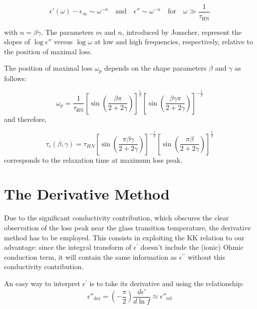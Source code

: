 \[
\epsilon'(\omega) - \epsilon_\infty \sim \omega^{-n} \quad \text{and} \quad \epsilon'' \sim \omega^{-n} \quad \text{for} \quad \omega \gg \frac{1}{\tau_{\text{HN}}}
\]

with \( n = \beta \gamma \). The parameters \( m \) and \( n \), introduced by Jonscher, represent the slopes of \( \log \epsilon'' \) versus \( \log \omega \) at low and high frequencies, respectively, relative to the position of maximal loss.

The position of maximal loss \( \omega_p \) depends on the shape parameters \( \beta \) and \( \gamma \) as follows:

\[
\omega_p = \frac{1}{\tau_{\text{HN}}} \left[ \sin \left(\frac{\beta \pi}{2 + 2\gamma}\right) \right]^{\frac{1}{\beta}} \left[\sin \left(\frac{\beta \gamma \pi}{2 + 2\gamma}\right)\right]^{-\frac{1}{\beta}}
\]
and therefore,

\[
	\tau_c(\beta, \gamma) = \tau_{HN} \left[\sin\left(\frac{\pi \beta \gamma}{2 + 2\gamma}\right)\right]^{-\frac{1}{\beta}} \left[\sin\left(\frac{\pi \beta}{2 + 2\gamma}\right)\right]^{\frac{1}{\beta}}
\]
corresponds to the relaxation time at maximum loss peak.
\section{The Derivative Method}

Due to the significant conductivity contribution, which obscures the clear observation of the loss peak near the glass transition temperature, the derivative method has to be employed. %
This consists in exploiting the KK relation to our advantage: since the integral transform of $\epsilon^\prime$ doesn't include the (ionic) Ohmic conduction term, it will contain the same information as $\epsilon^{\prime\prime}$ without this conductivity contribution.

An easy way to interpret $\epsilon^\prime$ is to take its derivative and using the relationship: \[
\epsilon''_{\text{der}} = \left(-\frac{\pi}{2}\right)\frac{d\epsilon'}{d\ln f} \approx \epsilon''_{\text{rel}}
\]
